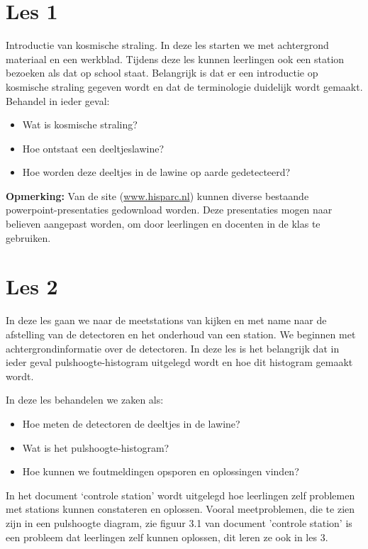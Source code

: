 \section{Les 1}

Introductie van kosmische straling. In deze les starten we met
achtergrond materiaal en een werkblad. Tijdens deze les kunnen
leerlingen ook een station bezoeken als dat op school staat. Belangrijk
is dat er een introductie op kosmische straling gegeven wordt en dat de
terminologie duidelijk wordt gemaakt.
Behandel in ieder geval:

\begin{itemize}
    \item Wat is kosmische straling?
    \item Hoe ontstaat een deeltjeslawine? 
    \item Hoe worden deze deeltjes in de lawine op aarde gedetecteerd?
\end{itemize}

\textbf{Opmerking:}
Van de \hisparc site (\url{www.hisparc.nl}) kunnen diverse bestaande powerpoint-presentaties
gedownload worden.
Deze presentaties mogen naar believen aangepast worden, om door leerlingen en docenten
in de klas te gebruiken.


\section{Les 2}

In deze les gaan we naar de meetstations van \hisparc kijken en met name naar de
afstelling van de detectoren en het onderhoud van een station.
We beginnen met achtergrondinformatie over de detectoren. In deze les is het 
belangrijk dat in ieder geval pulshoogte-histogram uitgelegd wordt en hoe dit histogram
gemaakt wordt.

In deze les behandelen we zaken als:
\begin{itemize}
    \item Hoe meten de detectoren de deeltjes in de lawine?
    \item Wat is het pulshoogte-histogram?
    \item Hoe kunnen we foutmeldingen opsporen en oplossingen vinden?
\end{itemize}

In het document `controle station' wordt uitgelegd hoe leerlingen zelf
problemen met stations kunnen constateren en oplossen. Vooral meetproblemen, die te zien zijn in een
pulshoogte diagram, zie figuur 3.1 van document 'controle station' is
een probleem dat leerlingen zelf kunnen oplossen, dit leren ze ook in les 3.


